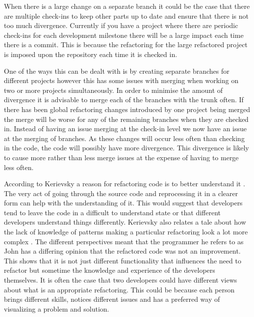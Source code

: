 
When there is a large change on a separate branch it could be the case that there are multiple check-ins to keep other parts up to date and ensure that there is not too much divergence.  Currently if you have a project where there are periodic check-ins for each development milestone there will be a large impact each time there is a commit. This is because the refactoring for the large refactored project is imposed upon the repository each time it is checked in.

One of the ways this can be dealt with is by creating separate branches for different projects however this has some issues with merging when working on two or more projects simultaneously.  In order to minimise the amount of divergence it is advisable to merge each of the branches with the trunk often.  If there has been global refactoring changes introduced by one project being merged the merge will be worse for any of the remaining branches when they are checked in.  Instead of having an issue merging at the check-in level we now have an issue at the merging of branches.  As these changes will occur less often than checking in the code, the code will possibly have more divergence.  This divergence is likely to cause more rather than less merge issues at the expense of having to merge less often.

According to  Kerievsky a reason for refactoring code is to better understand it \cite{Kerievsky2004}. The very act of going through the source code and reprocessing it in a clearer form can help with the understanding of it. This would suggest that developers tend to leave the code in a difficult to understand state or that different developers understand things differently.
Kerievsky also relates a tale about how the lack of knowledge of patterns making a particular refactoring look a lot more complex \cite{Kerievsky2004}. The different perspectives meant that the programmer he refers to as John has a differing opinion that the refactored code was not an improvement. This shows that it is not just different functionality that influences the need to refactor but sometime the knowledge and experience of the developers themselves. It is often the case that two developers could have different views about what is an appropriate refactoring. This could be because each person brings different skills, notices different issues and has a preferred way of visualizing a problem and solution.

